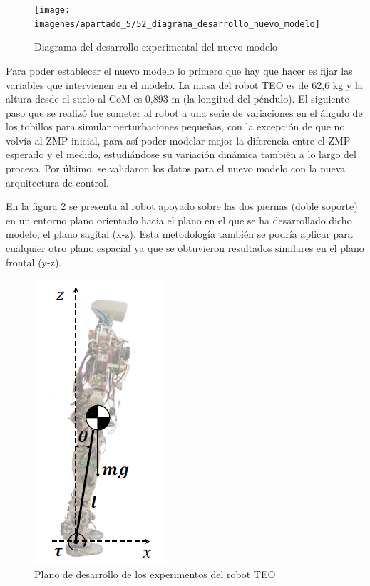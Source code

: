 \begin{figure}[H]
\centering
\texttt{[image: imagenes/apartado\_5/52\_diagrama\_desarrollo\_nuevo\_modelo]}
\caption{Diagrama del desarrollo experimental del nuevo modelo}
\label{figura510}
\end{figure}

Para poder establecer el nuevo modelo lo primero que hay que hacer es fijar las variables que intervienen en el modelo. La masa del robot TEO es de 62,6 kg y la altura desde el suelo al CoM es 0,893 m (la longitud del péndulo). El siguiente paso que se realizó fue someter al robot a una serie de variaciones en el ángulo de los tobillos para simular perturbaciones pequeñas, con la excepción de que no volvía al ZMP inicial, para así poder modelar mejor la diferencia entre el ZMP esperado y el medido, estudiándose su variación dinámica también a lo largo del proceso. Por último, se validaron los datos para el nuevo modelo con la nueva arquitectura de control.

En la figura \ref{figura511} se presenta al robot apoyado sobre las dos piernas (doble soporte) en un entorno plano orientado hacia el plano en el que se ha desarrollado dicho modelo, el plano sagital (x-z). Esta metodología también se podría aplicar para cualquier otro plano espacial ya que se obtuvieron resultados similares en el plano frontal (y-z). 

\begin{figure}[H]
\centering
\includegraphics[scale=0.65]{imagenes/apartado_5/53_postura_inicial_experimental_teo}
\caption{Plano de desarrollo de los experimentos del robot TEO}
\label{figura511}
\end{figure}



